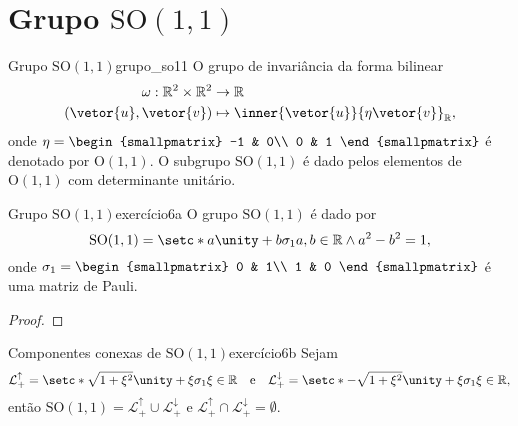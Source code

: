\section[Grupo SO(1,1)]{Grupo \(\mathrm{SO}(1,1)\)}
\begin{definition}{Grupo \(\mathrm{SO}(1,1)\)}{grupo_so11}
    O grupo de invariância da forma bilinear
    \begin{align*}
        \omega : \mathbb{R}^2 \times \mathbb{R}^2 &\to \mathbb{R}\\
                            (\vetor{u},\vetor{v}) &\mapsto \inner{\vetor{u}}{\eta\vetor{v}}_{\mathbb{R}},
    \end{align*}
    onde \(\eta = \begin{smallpmatrix}
        -1 & 0\\
        0 & 1
    \end{smallpmatrix}\) é denotado por \(\mathrm{O}(1,1)\). O subgrupo \(\mathrm{SO}(1,1)\) é dado pelos elementos de \(\mathrm{O}(1,1)\) com determinante unitário.
\end{definition}

\begin{proposition}{Grupo \(\mathrm{SO}(1,1)\)}{exercício6a}
    O grupo \(\mathrm{SO}(1,1)\) é dado por
    \begin{equation*}
        \mathrm{SO}(1,1) = \setc*{a \unity + b \sigma_1}{a, b\in \mathbb{R} \land a^2 - b^2 = 1},
    \end{equation*}
    onde \(\sigma_1 = \begin{smallpmatrix}
        0 & 1\\
        1 & 0
    \end{smallpmatrix}\) é uma matriz de Pauli.
\end{proposition}
\begin{proof}

\end{proof}

\begin{proposition}{Componentes conexas de \(\mathrm{SO}(1,1)\)}{exercício6b}
    Sejam
    \begin{equation*}
        \mathcal{L}_+^\uparrow = \setc*{\sqrt{1 + \xi^2}\unity + \xi \sigma_1}{\xi \in \mathbb{R}}
        \quad\text{e}\quad
        \mathcal{L}_+^\downarrow = \setc*{-\sqrt{1 + \xi^2}\unity + \xi \sigma_1}{\xi \in \mathbb{R}},
    \end{equation*}
    então \(\mathrm{SO}(1,1) = \mathcal{L}_+^\uparrow \cup \mathcal{L}_+^\downarrow\) e \(\mathcal{L}_+^\uparrow \cap \mathcal{L}_+^\downarrow = \emptyset\).
\end{proposition}
